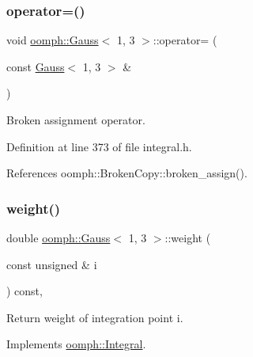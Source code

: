 \mbox{\label{classoomph_1_1Gauss_3_011_00_013_01_4_a9c73073da51aabd3b9fa7ad395cc3462}} 
\subsubsection{\texorpdfstring{operator=()}{operator=()}}
{\footnotesize\ttfamily void \hyperlink{classoomph_1_1Gauss}{oomph\+::\+Gauss}$<$ 1, 3 $>$\+::operator= (\begin{DoxyParamCaption}\item[{const \hyperlink{classoomph_1_1Gauss}{Gauss}$<$ 1, 3 $>$ \&}]{ }\end{DoxyParamCaption})\hspace{0.3cm}{\ttfamily [inline]}}



Broken assignment operator. 



Definition at line 373 of file integral.\+h.



References oomph\+::\+Broken\+Copy\+::broken\+\_\+assign().

\mbox{\label{classoomph_1_1Gauss_3_011_00_013_01_4_a3487f0b3416c7f8b6e81b4c86af53c05}} 
\subsubsection{\texorpdfstring{weight()}{weight()}}
{\footnotesize\ttfamily double \hyperlink{classoomph_1_1Gauss}{oomph\+::\+Gauss}$<$ 1, 3 $>$\+::weight (\begin{DoxyParamCaption}\item[{const unsigned \&}]{i }\end{DoxyParamCaption}) const\hspace{0.3cm}{\ttfamily [inline]}, {\ttfamily [virtual]}}



Return weight of integration point i. 



Implements \hyperlink{classoomph_1_1Integral_ac65335e2aab120b285b3d6c294507b06}{oomph\+::\+Integral}.



